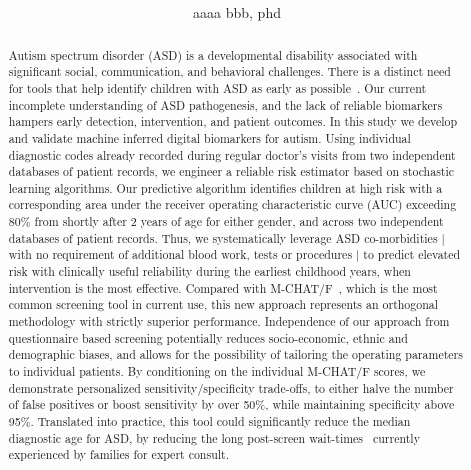 \documentclass[3p,super,numbers,sort&compress,preprint,10pt]{elsarticle}
\begin{document}
\begin{frontmatter}
	
\title{\mbox{}
}
    
\author[aa7e9daefff81]{aaaa bbb, phd}
    
\address[aa7e9daefff81]{medicine\unskip, 
    University Of Chicago\unskip, 900 E57 ST\unskip, Chicago\unskip, 60637\unskip, IL\unskip, United States. \\
    Tel.:~8144411296}
  

\begin{abstract}
 Autism spectrum disorder (ASD) is a developmental disability associated with  significant social, communication, and behavioral challenges. There is   a distinct need for tools that help identify children with ASD as early as possible~\cite{cdc0,nimh}.
Our current incomplete understanding of ASD pathogenesis, and the lack of reliable biomarkers hampers early detection,  intervention, and patient outcomes. 
In this study we develop and validate  machine inferred digital biomarkers for autism. Using individual diagnostic codes already recorded during regular doctor's visits from two independent databases of patient records, we engineer a reliable risk estimator based on stochastic learning algorithms. Our predictive algorithm identifies  children at high risk  with a corresponding area under the receiver operating characteristic curve (AUC)  exceeding 80\% from shortly after 2 years of age for either gender, and across two independent databases of patient records. Thus, we systematically leverage ASD co-morbidities | with no requirement of additional blood work, tests  or  procedures |  to predict  elevated  risk with clinically useful reliability during the earliest childhood years, when intervention is the  most effective.  Compared with  M-CHAT/F~\cite{pmid31562252}, which is the most common screening tool in current use, this new approach represents an orthogonal  methodology with strictly superior performance. Independence of our approach from questionnaire based screening potentially reduces socio-economic, ethnic and demographic biases, and allows for the possibility of  tailoring  the operating parameters  to individual patients. By conditioning on the individual M-CHAT/F scores, we demonstrate personalized sensitivity/specificity trade-offs,  to either halve the number of  false positives or boost sensitivity by over 50\%, while maintaining  specificity  above 95\%. Translated into practice, this tool could significantly reduce the median diagnostic age for ASD, by reducing the  long post-screen wait-times~\cite{pmid27565363} currently experienced by families for expert consult.
\end{abstract}
\end{frontmatter}
\end{document}
